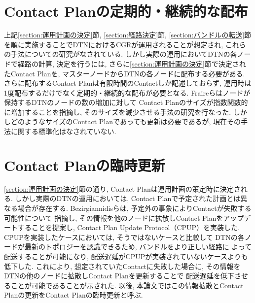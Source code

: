 \section{Contact Planの定期的・継続的な配布}
\label{section:Contact Planの定期的・継続的な配布}

上記\ref{section:運用計画の決定}節, \ref{section:経路決定}節, \ref{section:バンドルの転送}節
を順に実施することでDTNにおけるCGRが運用されることが想定され, 
これらの手法についての研究がなされている.  
しかし実際の運用においてDTNの各ノードで経路の計算, 決定を行うには, 
さらに\ref{section:運用計画の決定}節で決定されたContact Planを, 
マスターノードからDTNの各ノードに配布する必要がある.  
さらに配布するContact Planは有限時間のContactしか記述しておらず, 
運用時は1度配布するだけでなく定期的・継続的な配布が必要となる.  
Fraireらはノードが保持するDTNのノードの数の増加に対して
Contact Planのサイズが指数関数的に増加することを指摘し, 
そのサイズを減少させる手法の研究を行なった\cite{FRAIRE2018}.  
しかしどのようなサイズのContact Planであっても更新は必要であるが, 
現在その手法に関する標準化はなされていない.  

\section{Contact Planの臨時更新}
\label{section:ContactPlanの臨時更新}
\ref{section:運用計画の決定}節の通り, Contact Planは運用計画の策定時に決定される.  
しかし実際のDTNの運用においては, Contact Planで予定された計画とは異なる場合が存在する.  
Bezirgiannidisらは, 予定外の事象によりContactが失敗する可能性について
指摘し, その情報を他のノードに拡散しContact Planをアップデートすることを提案し, 
Contact Plan Update Protocol（CPUP）を実装した\cite{Bezirgiannidis2013}.  
CPUPを実装したケースにおいては, そうではないケースと比較して
DTNの各ノードが最新のトポロジーを認識できるため, バンドルをより正しい経路に
よって配送することが可能になり, 配送遅延がCPUPが実装されていないケースよりも
低下した. これにより, 想定されていたContactに失敗した場合に, 
その情報をDTNの他のノードに拡散しContact Planを更新することで
配送遅延を低下させることが可能であることが示された. 
以後, 本論文ではこの情報拡散とContact Planの更新をContact Planの臨時更新と呼ぶ. 

